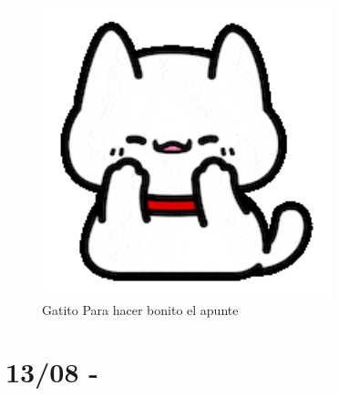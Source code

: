 \documentclass[12pt, letterpaper]{article}
\begin{document}
\begin{figure}[h!]
	\centering
	\includegraphics[width=0.75\textwidth]{Gat}
	\caption{Gatito Para hacer bonito el apunte}
	\label{fig:Gat}
\end{figure}


\newpage

\section{13/08 - }
\end{document}
